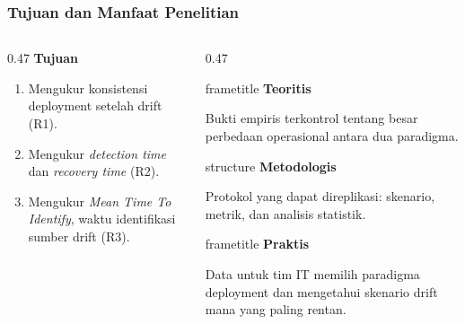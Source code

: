 {
\usebackgroundtemplate{\backgroundcontent}
\begin{frame}
    \frametitle{Tujuan dan Manfaat Penelitian}
    \vspace{0.04cm}
    \begin{columns}[T]
        \begin{column}{0.47\textwidth}
            \small\textbf{Tujuan}
            \begin{enumerate}\setlength{\itemsep}{2pt}
                \item Mengukur konsistensi deployment setelah drift (R1).
                \item Mengukur \textit{detection time} dan \textit{recovery time} (R2).
                \item Mengukur \textit{Mean Time To Identify}, waktu identifikasi sumber drift (R3).
            \end{enumerate}
        \end{column}
        \begin{column}{0.47\textwidth}
            \begin{beamercolorbox}[wd=\textwidth, sep=0.10cm, center, rounded=true]{frametitle}
                \small\bfseries Teoritis
            \end{beamercolorbox}
            \vspace{0.03cm}
            \scriptsize Bukti empiris terkontrol tentang besar perbedaan operasional antara dua paradigma.
            \vspace{0.10cm}
            \begin{beamercolorbox}[wd=\textwidth, sep=0.10cm, center, rounded=true]{structure}
                \small\bfseries Metodologis
            \end{beamercolorbox}
            \vspace{0.03cm}
            \scriptsize Protokol yang dapat direplikasi: skenario, metrik, dan analisis statistik.
            \vspace{0.10cm}
            \begin{beamercolorbox}[wd=\textwidth, sep=0.10cm, center, rounded=true]{frametitle}
                \small\bfseries Praktis
            \end{beamercolorbox}
            \vspace{0.03cm}
            \scriptsize Data untuk tim IT memilih paradigma deployment dan mengetahui skenario drift mana yang paling rentan.
        \end{column}
    \end{columns}
    \vspace{0.08cm}
\end{frame}}
